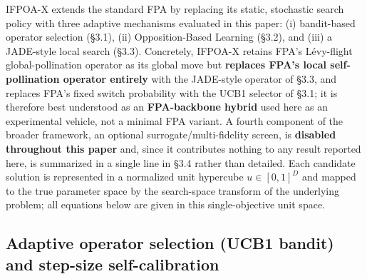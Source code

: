 \documentclass[preprint,12pt]{elsarticle}
\begin{document}
IFPOA-X extends the standard FPA \cite{yang2012flower} by replacing its static, stochastic search policy with three adaptive mechanisms evaluated in this paper: (i) bandit-based operator selection (\S3.1), (ii) Opposition-Based Learning (\S3.2), and (iii) a JADE-style local search (\S3.3). Concretely, IFPOA-X retains FPA's L\'evy-flight global-pollination operator as its global move but \textbf{replaces FPA's local self-pollination operator entirely} with the JADE-style operator of \S3.3, and replaces FPA's fixed switch probability with the UCB1 selector of \S3.1; it is therefore best understood as an \textbf{FPA-backbone hybrid} used here as an experimental vehicle, not a minimal FPA variant. A fourth component of the broader framework, an optional surrogate/multi-fidelity screen, is \textbf{disabled throughout this paper} and, since it contributes nothing to any result reported here, is summarized in a single line in \S3.4 rather than detailed. Each candidate solution is represented in a normalized unit hypercube $u \in [0,1]^D$ and mapped to the true parameter space by the search-space transform of the underlying problem; all equations below are given in this single-objective unit space.

\subsection{Adaptive operator selection (UCB1 bandit) and step-size self-calibration}
\label{subsec3-1}
\end{document}
